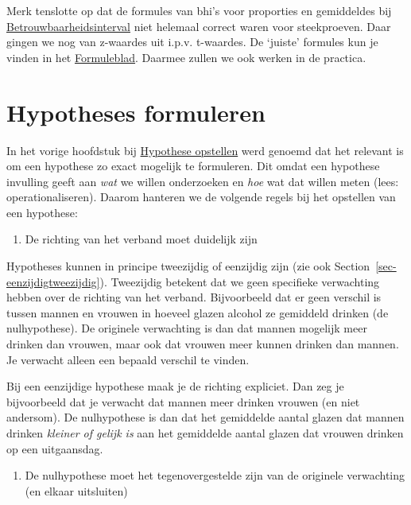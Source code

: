 \documentclass[
  letterpaper,
  DIV=11,
  numbers=noendperiod]{scrreprt}
\providecommand{\tightlist}{%
  \setlength{\itemsep}{0pt}\setlength{\parskip}{0pt}}
\begin{document}
Merk tenslotte op dat de formules van bhi's voor proporties en
gemiddeldes bij
\hyperref[betrouwbaarheidsinterval]{Betrouwbaarheidsinterval} niet
helemaal correct waren voor steekproeven. Daar gingen we nog van
z-waardes uit i.p.v. t-waardes. De `juiste' formules kun je vinden in
het \href{formuleblad.qmd}{Formuleblad}. Daarmee zullen we ook werken in
de practica.

\section{Hypotheses formuleren}\label{sec-hypoformuleren}

In het vorige hoofdstuk bij \hyperref[sec-opstellenhypo]{Hypothese
opstellen} werd genoemd dat het relevant is om een hypothese zo exact
mogelijk te formuleren. Dit omdat een hypothese invulling geeft aan
\emph{wat} we willen onderzoeken en \emph{hoe} wat dat willen meten
(lees: operationaliseren). Daarom hanteren we de volgende regels bij het
opstellen van een hypothese:

\begin{enumerate}
\def\labelenumi{\arabic{enumi}.}
\tightlist
\item
  De richting van het verband moet duidelijk zijn
\end{enumerate}

Hypotheses kunnen in principe tweezijdig of eenzijdig zijn (zie ook
Section~\ref{sec-eenzijdigtweezijdig}). Tweezijdig betekent dat we geen
specifieke verwachting hebben over de richting van het verband.
Bijvoorbeeld dat er geen verschil is tussen mannen en vrouwen in hoeveel
glazen alcohol ze gemiddeld drinken (de nulhypothese). De originele
verwachting is dan dat mannen mogelijk meer drinken dan vrouwen, maar
ook dat vrouwen meer kunnen drinken dan mannen. Je verwacht alleen een
bepaald verschil te vinden.

Bij een eenzijdige hypothese maak je de richting expliciet. Dan zeg je
bijvoorbeeld dat je verwacht dat mannen meer drinken vrouwen (en niet
andersom). De nulhypothese is dan dat het gemiddelde aantal glazen dat
mannen drinken \emph{kleiner of gelijk is} aan het gemiddelde aantal
glazen dat vrouwen drinken op een uitgaansdag.

\begin{enumerate}
\def\labelenumi{\arabic{enumi}.}
\setcounter{enumi}{1}
\tightlist
\item
  De nulhypothese moet het tegenovergestelde zijn van de originele
  verwachting (en elkaar uitsluiten)
\end{enumerate}
\end{document}
